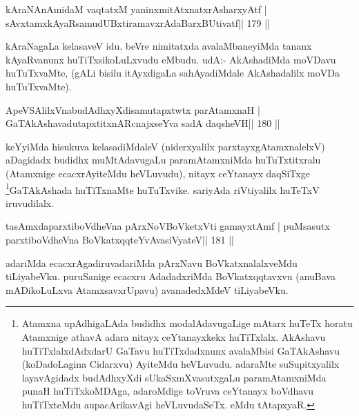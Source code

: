 
\begin{shl}
kAraNAnAmidaM vaqtatxM yaninxmitAtxnatxrAsharxyAtf |
sAvxtamxkAyaRsamudUBxtiramavxrAdaBarxBUtivatf\hfill || 179 ||
\end{shl}

\begin{artha}
kAraNagaLa kelasaveV idu. beVre nimitatxda avalaMbaneyiMda tananx  kAyaRvanunx huTiTxsikoLuLxvudu eMbudu. udA:- AkAshadiMda moVDavu  huTuTxvaMte, (gALi bisilu itAyxdigaLa sahAyadiMdale AkAshadalilx moVDa huTuTxvaMte).
\end{artha}


\begin{shl}
ApeVSAlilxVnabudAdhxyXdisamutapxtwtx parAtamxnaH |
GaTAkAshavadutapxtitxnARcnajxseYva sadA daqsheVH\hfill || 180 ||
\end{shl}

\begin{artha}
keYyiMda hisukuva kelasadiMdaleV (niderxyalilx parxtayxgAtamxnalelxV) 
aDagidadx budidhx muMtAdavugaLu paramAtamxniMda huTuTxtitxralu 
(Atamxnige ecacxrAyiteMdu heVLuvudu), nitayx ceYtanayx daqSiTxge 
\footnote[13]{Atamxna upAdhigaLAda budidhx modalAdavugaLige mAtarx 
huTeTx horatu Atamxnige athavA adara nitayx ceYtanayxkekx huTiTxlalx. 
AkAshavu huTiTxlalxdAdxdarU GaTavu huTiTxdadxnunx avalaMbisi 
GaTAkAshavu (koDadoLagina Cidarxvu) AyiteMdu heVLuvudu. adaraMte suSupitxyalilx layavAgidadx budAdhxyXdi sUkaSxmXvasutxgaLu paramAtamxniMda punaH huTiTxkoMDAga, adaroMdige toVruva ceYtanayx boVdhavu huTiTxteMdu aupacArikavAgi heVLuvudaSeTx. eMdu tAtapxyaR.}GaTAkAshada huTiTxnaMte huTuTxvike. sariyAda riVtiyalilx huTeTxV iruvudilalx.
\end{artha}


\begin{shl}
tasAmxdaparxtiboVdheVna pArxNoV\s BoVketxVti gamayxtAmf |
puMsasutx parxtiboVdheVna BoVkatxqqteYvAvasiVyateV\hfill || 181 ||
\end{shl}

\begin{artha}
adariMda ecacxrAgadiruvadariMda pArxNavu BoVkatxnalalxveMdu tiLiyabeVku. puruSa\-nige ecacxru AdadadxriMda BoVkatxqqtavxvu (anuBava mADikoLuLxva Atamx\-savxrUpavu) avanadedxMdeV tiLiyabeVku.
\end{artha}

